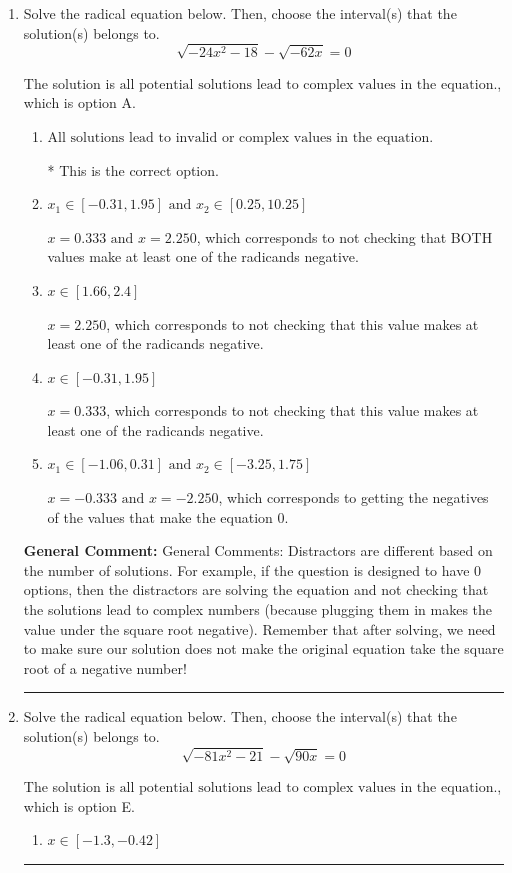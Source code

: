 \documentclass{extbook}[14pt]
\newcommand{\litem}[1]{\item #1

\rule{\textwidth}{0.4pt}}
\begin{document}
\begin{enumerate}\litem{
Solve the radical equation below. Then, choose the interval(s) that the solution(s) belongs to.
\[ \sqrt{-24 x^2 - 18} - \sqrt{-62 x} = 0 \]

The solution is \( \text{all potential solutions lead to complex values in the equation.} \), which is option A.\begin{enumerate}[label=\Alph*.]
\item \( \text{All solutions lead to invalid or complex values in the equation.} \)

* This is the correct option.
\item \( x_1 \in [-0.31, 1.95] \text{ and } x_2 \in [0.25,10.25] \)

$x = 0.333 \text{ and } x = 2.250$, which corresponds to not checking that BOTH values make at least one of the radicands negative.
\item \( x \in [1.66,2.4] \)

$x = 2.250$, which corresponds to not checking that this value makes at least one of the radicands negative.
\item \( x \in [-0.31,1.95] \)

$x = 0.333$, which corresponds to not checking that this value makes at least one of the radicands negative.
\item \( x_1 \in [-1.06, 0.31] \text{ and } x_2 \in [-3.25,1.75] \)

$x = -0.333 \text{ and } x = -2.250$, which corresponds to getting the negatives of the values that make the equation 0.
\end{enumerate}

\textbf{General Comment:} General Comments: Distractors are different based on the number of solutions. For example, if the question is designed to have 0 options, then the distractors are solving the equation and not checking that the solutions lead to complex numbers (because plugging them in makes the value under the square root negative). Remember that after solving, we need to make sure our solution does not make the original equation take the square root of a negative number!
}
\litem{
Solve the radical equation below. Then, choose the interval(s) that the solution(s) belongs to.
\[ \sqrt{-81 x^2 - 21} - \sqrt{90 x} = 0 \]

The solution is \( \text{all potential solutions lead to complex values in the equation.} \), which is option E.\begin{enumerate}[label=\Alph*.]
\item \( x \in [-1.3,-0.42] \)


\end{enumerate}}
\end{enumerate}
\end{document}
